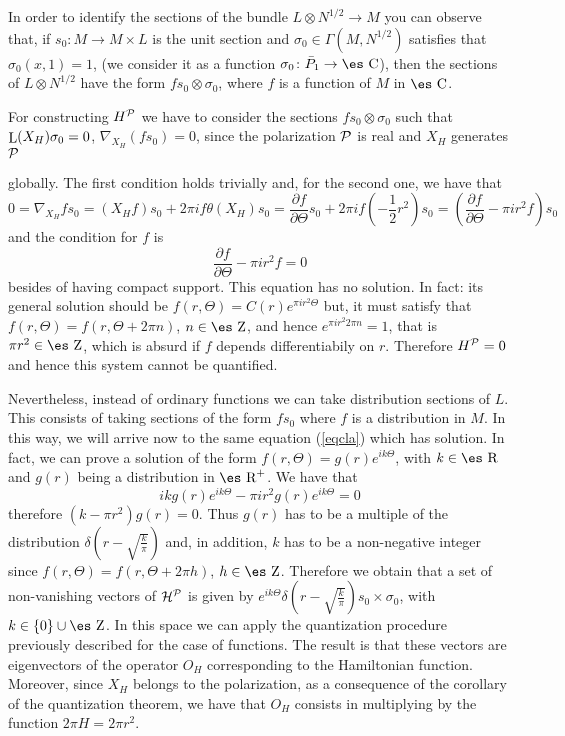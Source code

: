 \documentclass[12pt]{article}
\theoremstyle{plain}
\def\beq{\begin{equation}}
\def\eeq{\end{equation}}
\def\derpar#1#2{\frac{\partial{#1}}{\partial{#2}}}
\def\Zahl{\mbox{\es Z}}
\def\Real{\mbox{\es R}}
\def\Complex{\mbox{\es C}}
\def\Lie{\mathop{\rm L}\nolimits}
\begin{document}
In order to identify the sections of the bundle
$L \otimes N^{1/2} \to M$ you can observe that, if
$s_0 \colon M \to M \times L$ is the unit section and
$\sigma_0 \in \Gamma (M,N^{1/2})$ satisfies that
$\sigma_0(x,1)=1$, (we consider it as a function
$\sigma_0 \colon \bar P_1 \to \Complex$),
then the sections of $L \otimes N^{1/2}$ have the form
$fs_0 \otimes \sigma_0$, where $f$ is a function of $M$ in $\Complex$.

For constructing $H^{\cal P}$ we have to consider the sections
$fs_0 \otimes \sigma_0$ such that
$\Lie(X_H)\sigma_0=0$, $\nabla_{X_H}(fs_0)=0$,
since the polarization ${\cal P}$ is real and $X_H$ generates ${\cal P}$

globally.
The first condition holds trivially and, for the second one, we have
that
$$
0=\nabla_{X_H}fs_0 =(X_Hf)s_0 + 2\pi i f \theta (X_H)s_0=
\derpar{f}{\Theta}s_0 + 2\pi i f(-\frac{1}{2}r^2)s_0 =
(\derpar{f}{\Theta} - \pi i r^2 f)s_0
$$
and the condition for $f$ is
\beq
\derpar{f}{\Theta} - \pi i r^2 f = 0
\label{eqcla}
\eeq
besides of having compact support. This equation has no solution.
In fact: its general solution should be $f(r,\Theta) = C(r)e^{\pi i r^2
\Theta}$
but, it must satisfy that $f(r,\Theta) = f(r,\Theta+2\pi n)$, $n \in
\Zahl$,
and hence $e^{\pi i r^2 2 \pi n} = 1$,
that is $\pi r^2 \in \Zahl$, which is absurd if $f$ depends
differentiabily on $r$.
Therefore $H^{\cal P}=0$ and hence this system cannot be quantified.

Nevertheless, instead of ordinary functions we can take distribution
sections of $L$.
This consists of taking sections of the form $fs_0$ where $f$ is a
distribution in $M$.
In this way, we will arrive now to the same equation (\ref{eqcla}) which
has solution.
In fact, we can prove a solution of the form
$f(r,\Theta)=g(r)e^{ik\Theta}$, with $k \in \Real$ and $g(r)$
being a distribution in $\Real^+$. We have that
$$
ikg(r)e^{ik\Theta}-\pi ir^2g(r)e^{ik\Theta}=0
$$
therefore $(k-\pi r^2)g(r)=0$.
Thus $g(r)$ has to be a multiple of the distribution $\delta
(r-\sqrt{\frac{k}{\pi}})$
and, in addition, $k$ has to be a non-negative integer since
$f(r,\Theta ) = f(r,\Theta +2\pi h)$, $h \in \Zahl$.
Therefore we obtain that a set of non-vanishing vectors of
${\cal H}^{\cal P}$ is given by
$e^{ik\Theta}\delta (r-\sqrt{\frac{k}{\pi}})s_0 \times \sigma_0$,
with $k\in\{ 0\}\cup\Zahl$.
In this space we can apply the quantization procedure previously
described
for the case of functions. The result is that these vectors are
eigenvectors of the operator $O_H$ corresponding to the Hamiltonian
function.
Moreover, since $X_H$ belongs to the polarization,
as a consequence of the corollary of the quantization theorem,
we have that $O_H$ consists in multiplying by the function $2\pi H =
2\pi r^2$.
\end{document}
